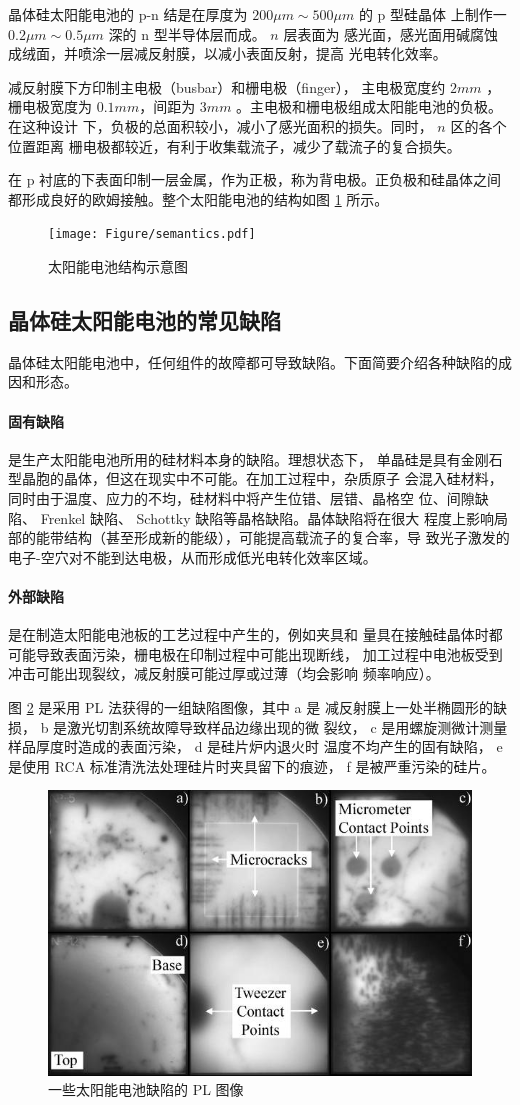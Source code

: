 晶体硅太阳能电池的 p-n 结是在厚度为 $200\mu m \sim 500\mu m$ 的 p 型硅晶体
上制作一 $0.2 \mu m \sim 0.5 \mu m$ 深的 n 型半导体层而成。 $n$ 层表面为
感光面，感光面用碱腐蚀成绒面，并喷涂一层减反射膜，以减小表面反射，提高
光电转化效率。

减反射膜下方印制主电极（busbar）和栅电极（finger），
主电极宽度约 $2mm$ ，栅电极宽度为
$0.1mm$，间距为 $3mm$ 。主电极和栅电极组成太阳能电池的负极。在这种设计
下，负极的总面积较小，减小了感光面积的损失。同时， $n$ 区的各个位置距离
栅电极都较近，有利于收集载流子，减少了载流子的复合损失。

在 p 衬底的下表面印制一层金属，作为正极，称为背电极。正负极和硅晶体之间
都形成良好的欧姆接触。整个太阳能电池的结构如图 \ref{fig:semantics} 所示。

\begin{figure}
\centering
\texttt{[image: Figure/semantics.pdf]}
\caption{太阳能电池结构示意图}
\label{fig:semantics}
\end{figure}

\subsection{晶体硅太阳能电池的常见缺陷}

晶体硅太阳能电池中，任何组件的故障都可导致缺陷。下面简要介绍各种缺陷的成
因和形态。

\paragraph{固有缺陷} 是生产太阳能电池所用的硅材料本身的缺陷。理想状态下，
单晶硅是具有金刚石型晶胞的晶体，但这在现实中不可能。在加工过程中，杂质原子
会混入硅材料，同时由于温度、应力的不均，硅材料中将产生位错、层错、晶格空
位、间隙缺陷、 Frenkel 缺陷、 Schottky 缺陷等晶格缺陷。晶体缺陷将在很大
程度上影响局部的能带结构（甚至形成新的能级），可能提高载流子的复合率，导
致光子激发的电子-空穴对不能到达电极，从而形成低光电转化效率区域。

\paragraph{外部缺陷} 是在制造太阳能电池板的工艺过程中产生的，例如夹具和
量具在接触硅晶体时都可能导致表面污染，栅电极在印制过程中可能出现断线，
加工过程中电池板受到冲击可能出现裂纹，减反射膜可能过厚或过薄（均会影响
频率响应）。

图 \ref{fig:PLimage} 是采用 PL 法获得的一组缺陷图像，其中 a 是 
减反射膜上一处半椭圆形的缺损， b 是激光切割系统故障导致样品边缘出现的微
裂纹， c 是用螺旋测微计测量样品厚度时造成的表面污染， d 是硅片炉内退火时
温度不均产生的固有缺陷， e 是使用 RCA 标准清洗法处理硅片时夹具留下的痕迹，
f 是被严重污染的硅片\cite{FastPL}。

\begin{figure}
\centering
\includegraphics[width=.6\textwidth]{Figure/PLimage.png}
\caption{一些太阳能电池缺陷的 PL 图像}
\label{fig:PLimage}
\end{figure}
